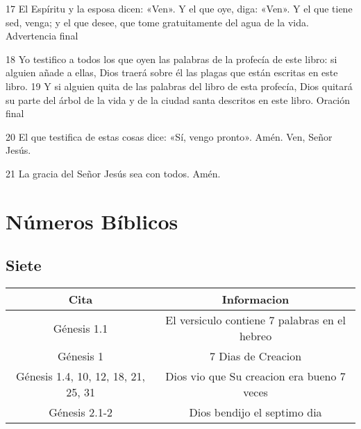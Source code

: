 \documentclass[12pt,twocolumn,twoside]{book}
\begin{document}
17 El Espíritu y la esposa dicen: «Ven». Y el que oye, diga: «Ven». Y el que tiene sed, venga; y el que desee, que tome gratuitamente del agua de la vida.
Advertencia final

18 Yo testifico a todos los que oyen las palabras de la profecía de este libro: si alguien añade a ellas, Dios traerá sobre él las plagas que están escritas en este libro. 19 Y si alguien quita de las palabras del libro de esta profecía, Dios quitará su parte del árbol de la vida y de la ciudad santa descritos en este libro.
Oración final

20 El que testifica de estas cosas dice: «Sí, vengo pronto». Amén. Ven, Señor Jesús.

21 La gracia del Señor Jesús sea con todos. Amén.

\appendix
\chapter{Números Bíblicos}
\section{Siete}
\begin{tabular}{||c | c||}
\hline
\textbf{Cita} & \textbf{Informacion}\\
\hline\hline
Génesis 1.1 & El versiculo contiene 7 palabras en el hebreo \\
\hline
Génesis 1 & 7 Dias de Creacion \\
\hline
Génesis 1.4, 10, 12, 18, 21, 25, 31 & Dios vio que Su creacion era bueno 7 veces \\
\hline
Génesis 2.1-2 & Dios bendijo el septimo dia\\
\hline
\end{tabular}
\printindex[scr]
\end{document}
